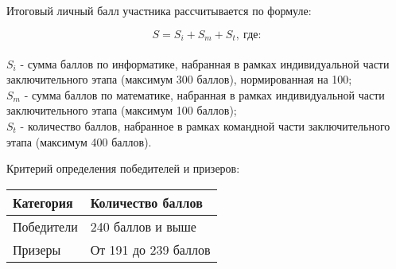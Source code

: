 Итоговый личный балл участника рассчитывается по формуле:

$$S = S_i + S_m + S_t, \: \text{где:}$$\\ 
$S_i$ - сумма баллов по информатике, набранная в рамках индивидуальной части заключительного этапа (максимум 300 баллов), нормированная на 100;\\
$S_m$ - сумма баллов по математике, набранная в рамках индивидуальной части заключительного этапа (максимум 100 баллов);\\
$S_t$ - количество баллов, набранное в рамках командной части заключительного этапа (максимум 400 баллов).

Критерий определения победителей и призеров:
\begin{center}
    \begin{tabular}{|l|l|}
        \hline
        Категория&Количество баллов\\
        \hline
        Победители&240 баллов и выше\\
        \hline
        Призеры&От 191 до 239 баллов\\
        \hline
    \end{tabular}
\end{center}
